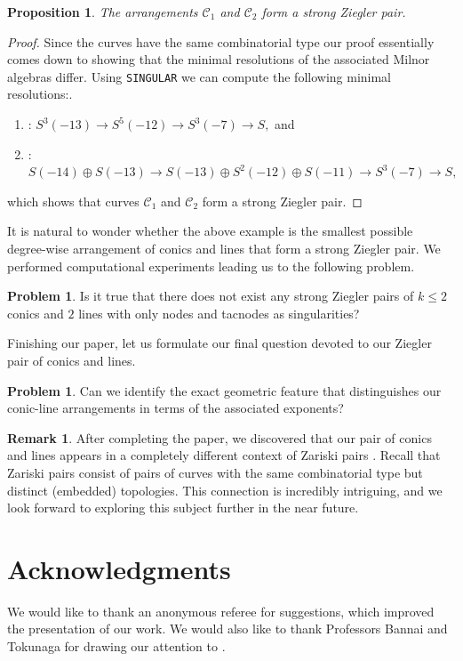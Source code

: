 \documentclass[11pt]{article}
\theoremstyle{plain}
\newtheorem{proposition}[thm]{Proposition}
\theoremstyle{definition}
\newtheorem{remark}[thm]{Remark}
\newtheorem{problem}[thm]{Problem}
\begin{document}
\begin{proposition}
\label{zzzz}
The arrangements $\mathcal{C}_{1}$ and $\mathcal{C}_{2}$ form a strong Ziegler pair.
\end{proposition}
\begin{proof}
Since the curves have the same combinatorial type our proof essentially comes down to showing that the minimal resolutions of the associated Milnor algebras differ. Using \verb}SINGULAR} we can compute the following minimal resolutions:.
\begin{enumerate}
\item[$\mathcal{C}_{1}$] :  $S^{3}(-13) \rightarrow S^{5}(-12) \rightarrow S^{3}(-7) \rightarrow S,$
and
\item[$\mathcal{C}_{2}$] : $S(-14) \oplus S(-13) \rightarrow S(-13) \oplus S^{2}(-12)\oplus S(-11) \rightarrow S^{3}(-7) \rightarrow S,$
\end{enumerate}
which shows that curves $\mathcal{C}_{1}$ and $\mathcal{C}_{2}$ form a strong Ziegler pair.
\end{proof}
It is natural to wonder whether the above example is the smallest possible degree-wise arrangement of conics and lines that form a strong Ziegler pair. We performed computational experiments leading us to the following problem.
\begin{problem}
Is it true that there does not exist any strong Ziegler pairs of $k\leq 2$ conics and $2$ lines with only nodes and tacnodes as singularities?
\end{problem}
Finishing our paper, let us formulate our final question devoted to our Ziegler pair of conics and lines.
\begin{problem}
Can we identify the exact geometric feature that distinguishes our conic-line arrangements in terms of the associated exponents?
\end{problem}
\begin{remark}
After completing the paper, we discovered that our pair of conics and lines appears in a completely different context of Zariski pairs \cite{am}. Recall that Zariski pairs consist of pairs of curves with the same combinatorial type but distinct (embedded) topologies. This connection is incredibly intriguing, and we look forward to exploring this subject further in the near future.
\end{remark}
\section*{Acknowledgments}
We would like to thank an anonymous referee for suggestions, which improved the presentation of our work. We would also like to thank Professors Bannai and Tokunaga for drawing our attention to \cite{am}.
\end{document}
